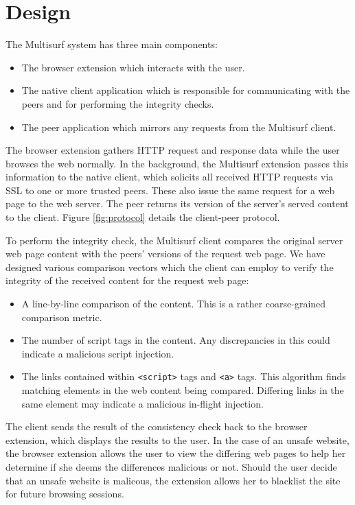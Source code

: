 \section{Design}
\label{sec:design}

The Multisurf system has three main components:
\begin{itemize}
\item The browser extension which interacts with the user.
\item The native client application which is responsible for communicating with the peers and for performing the integrity checks.
\item The peer application which mirrors any requests from the Multisurf client.
\end{itemize}

The browser extension gathers HTTP request and response data while the user browses the web normally.
In the background, the Multisurf extension passes this information to the native client, which solicits all received HTTP requests via SSL to one or more trusted peers.
These also issue the same request for a web page to the web server.
The peer returns its version of the server’s served content to the client.
Figure \ref{fig:protocol} details the client-peer protocol.

To perform the integrity check, the Multisurf client compares the original server web page content with the peers' versions of the request web page.
We have designed various comparison vectors which the client can employ to verify the integrity of the received content for the request web page:
\begin{itemize}
\item A line-by-line comparison of the content. This is a rather coarse-grained comparison metric.
\item The number of script tags in the content. Any discrepancies in this could indicate a malicious script injection.
\item The links contained within \texttt{<script>} tags and \texttt{<a>} tags. This algorithm finds matching elements in the web content being compared. Differing links in the same element may indicate a malicious in-flight injection.
\end{itemize}

The client sends the result of the consistency check back to the browser extension, which displays the results to the user.
In the case of an unsafe website, the browser extension allows the user to view the differing web pages to help her determine if she deems the differences malicious or not.
Should the user decide that an unsafe website is malicous, the extension allows her to blacklist the site for future browsing sessions.

